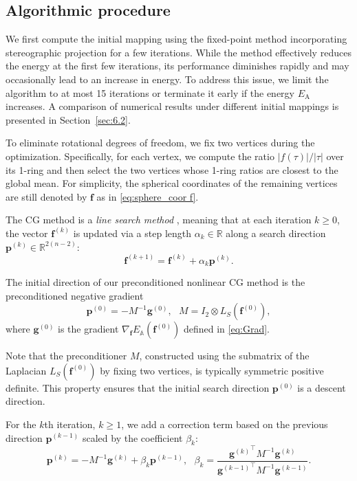 \documentclass{article}
\numberwithin{equation}{section}
\def\f{\mathbf{f}}
\def\g{\mathbf{g}}
\def\p{\mathbf{p}}
\def\rA{\mathrm{A}}
\def\bbA{\mathbb{A}}
\begin{document}
\subsection{Algorithmic procedure}
\label{sec:4.1}

{ 
We first compute the initial mapping using the fixed-point method incorporating stereographic projection \cite[Algorithm 4.3]{YuLL19} for a few iterations. While the method effectively reduces the energy at the first few iterations, its performance diminishes rapidly and may occasionally lead to an increase in energy. To address this issue, we limit the algorithm \cite[Algorithm 4.3]{YuLL19} to at most 15 iterations or terminate it early if the energy $E_\rA$ increases. A comparison of numerical results under different initial mappings is presented in Section~\ref{sec:6.2}.
}

To eliminate rotational degrees of freedom, we fix two vertices during the optimization. Specifically, for each vertex, we compute the ratio $|f(\tau)| / |\tau|$ over its 1-ring and then select the two vertices whose 1-ring ratios are closest to the global mean. For simplicity, the spherical coordinates of the remaining vertices are still denoted by $\f$ as in \eqref{eq:sphere_coor f}.

The CG method is a { \em line search method} \cite[Chapter 3]{NoWr06}, meaning that at each iteration $k \geq 0$, the vector $\f^{(k)}$ is updated via a step length $\alpha_k \in \mathbb{R}$ along a search direction $\p^{(k)} \in \mathbb{R}^{2(n-2)}$:
\begin{equation}  \label{eq:update}
    \f^{(k+1)} = \f^{(k)} + \alpha_k \p^{(k)}. 
\end{equation}

The initial direction of our preconditioned nonlinear CG method is the preconditioned negative gradient
\begin{equation} \label{eq:preconditioner}
    \p^{(0)} = -M^{-1} \g^{(0)}, ~~~ M = I_2 \otimes L_S(\f^{(0)}),
\end{equation}
where $\g^{(0)}$ is the gradient $ \nabla_{\f} E_\bbA(\f^{(0)})$ defined in \eqref{eq:Grad}.
{ 

Note that the preconditioner $M$, constructed using the submatrix of the Laplacian $L_S(\f^{(0)})$ by fixing two vertices, is typically symmetric positive definite. This property ensures that the initial search direction $\p^{(0)}$ is a descent direction. 
}
For the $k$th iteration, $k \geq 1$, we add a correction term based on the previous direction $\p^{(k-1)}$ scaled by the coefficient $\beta_k$:
\begin{equation} \label{eq:direction}
    \p^{(k)} = -M^{-1} \g^{(k)} + \beta_k \p^{(k-1)}, ~~~ \beta_k = \frac{{\g^{(k)}}^\top M^{-1} \g^{(k)} }{ {\g^{(k-1)}}^\top M^{-1} \g^{(k-1)} }.
\end{equation}
\end{document}
